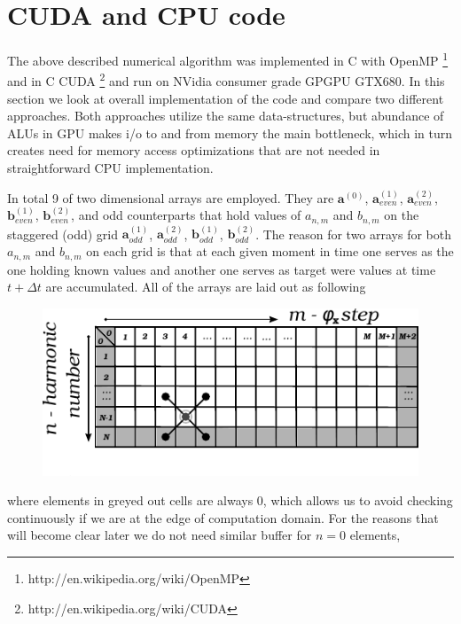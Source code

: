 \documentclass[40pt,letterpaper,physrev]{article}
\begin{document}
    \section{CUDA and CPU code}
    The above described numerical algorithm was implemented in C with 
    OpenMP \footnote{http://en.wikipedia.org/wiki/OpenMP} and in 
    C CUDA \footnote{http://en.wikipedia.org/wiki/CUDA} and run on NVidia consumer grade GPGPU GTX680. 
    In this section we look at overall implementation of the code and compare two different approaches.
    Both approaches utilize the same data-structures, but abundance of ALUs in GPU makes i/o to and from memory 
    the main bottleneck, which in turn creates need for memory access optimizations that are not needed in 
    straightforward CPU implementation. 
    
    In total 9 of two dimensional arrays are employed. They are $\mathbf{a}^{(0)}$, $\mathbf{a}^{(1)}_{even}$, 
    $\mathbf{a}^{(2)}_{even}$, $\mathbf{b}^{(1)}_{even}$, $\mathbf{b}^{(2)}_{even}$, and odd counterparts that 
    hold values of $a_{n,m}$ and $b_{n,m}$ on the staggered (odd) grid $\mathbf{a}^{(1)}_{odd}$, 
    $\mathbf{a}^{(2)}_{odd}$, $\mathbf{b}^{(1)}_{odd}$, $\mathbf{b}^{(2)}_{odd}$. The reason for two arrays for 
    both $a_{n,m}$ and $b_{n,m}$ on each grid is that at each given moment in time one serves as the one holding 
    known values and another one serves as target were values at time $t+\Delta t$ are accumulated. All of the arrays 
    are laid out as following
    \begin{figure}[H]
   	  \centering
	  \normalsize %
	  \includegraphics[scale=1.2]{illustrations/array_layout.pdf}
	  \label{fig:array_layout}
	  \caption{}
	\end{figure}
	where elements in greyed out cells are always $0$, which allows us to avoid checking continuously if we are at the 
	edge of computation domain. For the reasons that will become clear later we do not need similar buffer for $n=0$ elements, 
\end{document}
